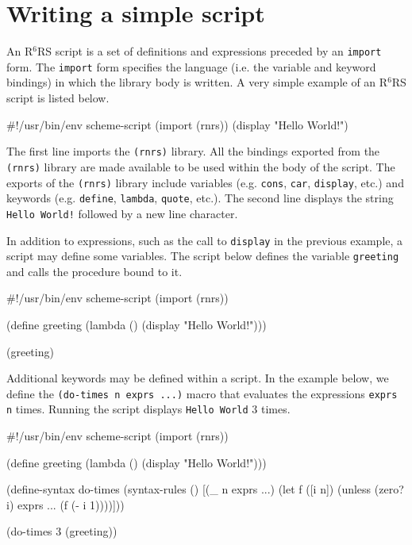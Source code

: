 \documentclass[onecolumn, 12pt, twoside, openright, dvipdfm]{book}
\newcommand{\rnrs}[1]{R$^{\mathrm{#1}}$RS}
\begin{document}
\section{\label{sec:scripts}Writing a simple script}

An \rnrs{6} script is a set of definitions and expressions preceded
by an \texttt{import} form.  The \texttt{import} form specifies
the language (i.e. the variable and keyword bindings) in which the
library body is written.  A very simple example of an \rnrs{6}
script is listed below.

\begin{CodeInline}
#!/usr/bin/env scheme-script
(import (rnrs))
(display "Hello World!\n")
\end{CodeInline}

The first line imports the \texttt{(rnrs)} library.  All the
bindings exported from the \texttt{(rnrs)} library are made
available to be used within the body of the script.  
The exports of the \texttt{(rnrs)} library include variables
(e.g. \texttt{cons}, \texttt{car}, \texttt{display}, etc.) and
keywords (e.g.  \texttt{define}, \texttt{lambda}, \texttt{quote},
etc.).  The second line displays the string \texttt{Hello World!}
followed by a new line character.

In addition to expressions, such as the call to \texttt{display} in
the previous example, a script may define some variables.  The
script below defines the variable \texttt{greeting} and calls the
procedure bound to it.

\begin{CodeInline}
#!/usr/bin/env scheme-script
(import (rnrs))

(define greeting
  (lambda ()
    (display "Hello World!\n")))

(greeting)
\end{CodeInline}

Additional keywords may be defined within a script.  In the example
below, we define the \texttt{(do-times n exprs ...)} macro that
evaluates the expressions \texttt{exprs} \texttt{n} times.  Running
the script displays \texttt{Hello World} 3 times.
\newpage

\begin{CodeInline}
#!/usr/bin/env scheme-script
(import (rnrs))

(define greeting
  (lambda ()
    (display "Hello World!\n")))

(define-syntax do-times
  (syntax-rules ()
    [(_ n exprs ...)
     (let f ([i n])
       (unless (zero? i)
         exprs ...
         (f (- i 1))))]))

(do-times 3 (greeting))
\end{CodeInline}
\end{document}
